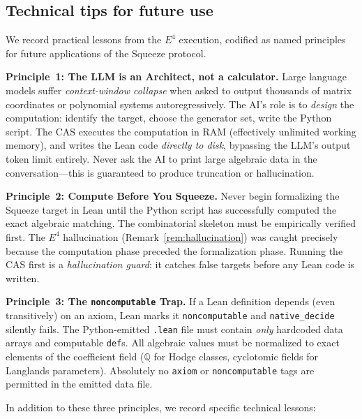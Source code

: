 \documentclass[11pt]{article}
\theoremstyle{plain}
\theoremstyle{definition}
\theoremstyle{remark}
\newcommand{\Q}{\mathbb{Q}}
\begin{document}
\subsection{Technical tips for future use}\label{sec:tips}

We record practical lessons from the $E^4$ execution, codified as
named principles for future applications of the Squeeze protocol.

\medskip\noindent
\textbf{Principle~1: The LLM is an Architect, not a calculator.}
Large language models suffer \emph{context-window collapse} when
asked to output thousands of matrix coordinates or polynomial
systems autoregressively.  The AI's role is to \emph{design} the
computation: identify the target, choose the generator set, write
the Python script.  The CAS executes the computation in RAM
(effectively unlimited working memory), and writes the Lean code
\emph{directly to disk}, bypassing the LLM's output token limit
entirely.  Never ask the AI to print large algebraic data in the
conversation---this is guaranteed to produce truncation or
hallucination.

\medskip\noindent
\textbf{Principle~2: Compute Before You Squeeze.}
Never begin formalizing the Squeeze target in Lean until the
Python script has successfully computed the exact algebraic
matching.  The combinatorial skeleton must be empirically verified
first.  The $E^4$ hallucination (Remark~\ref{rem:hallucination})
was caught precisely because the computation phase preceded the
formalization phase.  Running the CAS first is a \emph{hallucination
guard}: it catches false targets before any Lean code is written.

\medskip\noindent
\textbf{Principle~3: The \texttt{noncomputable} Trap.}
If a Lean definition depends (even transitively) on an axiom,
Lean marks it \texttt{noncomputable} and \texttt{native\_decide}
silently fails.  The Python-emitted \texttt{.lean} file must
contain \emph{only} hardcoded data arrays and computable
\texttt{def}s.  All algebraic values must be normalized to exact
elements of the coefficient field ($\Q$ for Hodge classes,
cyclotomic fields for Langlands parameters).  Absolutely no
\texttt{axiom} or \texttt{noncomputable} tags are permitted in
the emitted data file.

\medskip\noindent
In addition to these three principles, we record specific
technical lessons:
\end{document}
